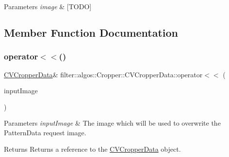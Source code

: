 \begin{DoxyParams}{Parameters}
{\em image} & \mbox{[}T\+O\+DO\mbox{]} \\
\hline
\end{DoxyParams}


\subsection{Member Function Documentation}
\mbox{\label{classfilter_1_1algos_1_1_cropper_1_1_c_v_cropper_data_a8f551ce95e4cea54230ddbbd5b1cc6db}} 
\subsubsection{\texorpdfstring{operator$<$$<$()}{operator<<()}\hspace{0.1cm}{\footnotesize\ttfamily [1/2]}}
{\footnotesize\ttfamily \hyperlink{classfilter_1_1algos_1_1_cropper_1_1_c_v_cropper_data}{C\+V\+Cropper\+Data}\& filter\+::algos\+::\+Cropper\+::\+C\+V\+Cropper\+Data\+::operator$<$$<$ (\begin{DoxyParamCaption}\item[{\hyperlink{classfilter_1_1data_1_1_image_data}{data\+::\+Image\+Data} \&}]{input\+Image }\end{DoxyParamCaption})\hspace{0.3cm}{\ttfamily [inline]}}


\begin{DoxyParams}{Parameters}
{\em input\+Image} & The image which will be used to overwrite the Pattern\+Data request image. \\
\hline
\end{DoxyParams}
\begin{DoxyReturn}{Returns}
Returns a reference to the \hyperlink{classfilter_1_1algos_1_1_cropper_1_1_c_v_cropper_data}{C\+V\+Cropper\+Data} object. 
\end{DoxyReturn}
\mbox{\label{classfilter_1_1algos_1_1_cropper_1_1_c_v_cropper_data_a74dba06cb470f371cd3658f6a11021e6}} 
